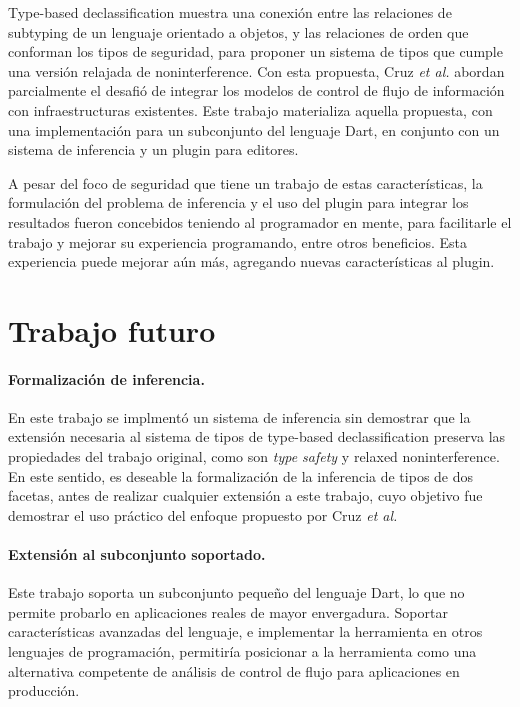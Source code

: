 \begin{conclusion}

	Type-based declassification muestra una conexión entre las relaciones de subtyping de un lenguaje orientado a objetos, y las relaciones de orden que conforman los tipos de seguridad, para proponer un sistema de tipos que cumple una versión relajada de noninterference. Con esta propuesta, Cruz \textit{et al.} abordan parcialmente el desafió de integrar los modelos de control de flujo de información con infraestructuras existentes. Este trabajo materializa aquella propuesta, con una implementación para un subconjunto del lenguaje Dart, en conjunto con un sistema de inferencia y un plugin para editores.

	A pesar del foco de seguridad que tiene un trabajo de estas características, la formulación del problema de inferencia y el uso del plugin para integrar los resultados fueron concebidos teniendo al programador en mente, para facilitarle el trabajo y mejorar su experiencia programando, entre otros beneficios. Esta experiencia puede mejorar aún más, agregando nuevas características al plugin.

	\section*{Trabajo futuro}

	\paragraph{Formalización de inferencia.}En este trabajo se implmentó un sistema de inferencia sin demostrar que la extensión necesaria al sistema de tipos de type-based declassification preserva las propiedades del trabajo original, como son \emph{type safety} y relaxed noninterference. En este sentido, es deseable la formalización de la inferencia de tipos de dos facetas, antes de realizar cualquier extensión a este trabajo, cuyo objetivo fue demostrar el uso práctico del enfoque propuesto por Cruz \textit{et al.}

	\paragraph{Extensión al subconjunto soportado.}Este trabajo soporta un subconjunto pequeño del lenguaje Dart, lo que no permite probarlo en aplicaciones reales de mayor envergadura. Soportar características avanzadas del lenguaje, e implementar la herramienta en otros lenguajes de programación, permitiría posicionar a la herramienta como una alternativa competente de análisis de control de flujo para aplicaciones en producción.


\end{conclusion}
